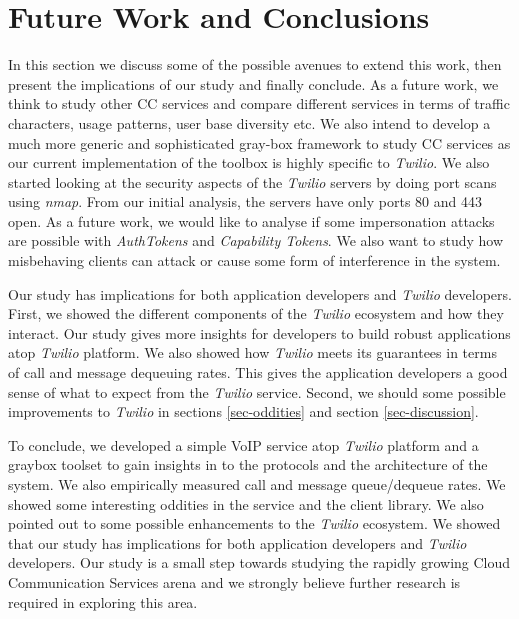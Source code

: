 \section{Future Work and Conclusions}
\label{sec-futureandconclusion}

In this section we discuss some of the possible avenues to extend this work, then present the implications of our study and finally conclude. As a future work, we think to study other CC services and compare different services in terms of traffic characters, usage patterns, user base diversity etc. We also intend to develop a much more generic and sophisticated gray-box framework to study CC services as our current implementation of the toolbox is highly specific to \textit{Twilio}. We also started looking at the security aspects of the \textit{Twilio} servers by doing port scans using \textit{nmap}. From our initial analysis, the servers have only ports 80 and 443 open. As a future work, we would like to analyse if some impersonation attacks are possible with \textit{AuthTokens} and \textit{Capability Tokens}. We also want to study how misbehaving clients can attack or cause some form of interference in the system.

Our study has implications for both application developers and \textit{Twilio} developers. First, we showed the different components of the \textit{Twilio} ecosystem and how they interact. Our study gives more insights for developers to build robust applications atop \textit{Twilio} platform. We also showed how \textit{Twilio} meets its guarantees in terms of call and message dequeuing rates. This gives the application developers a good sense of what to expect from the \textit{Twilio} service. Second, we should some possible improvements to \textit{Twilio} in sections \ref{sec-oddities} and section \ref{sec-discussion}.

To conclude, we developed a simple VoIP service atop \textit{Twilio} platform and a graybox toolset to gain insights in to the protocols and the architecture of the system. We also empirically measured call and message queue/dequeue rates. We showed some interesting oddities in the service and the client library. We also pointed out to some possible enhancements to the \textit{Twilio} ecosystem. We showed that our study has implications for both application developers and \textit{Twilio} developers. Our study is a small step towards studying the rapidly growing Cloud Communication Services arena and we strongly believe further research is required in exploring this area. 